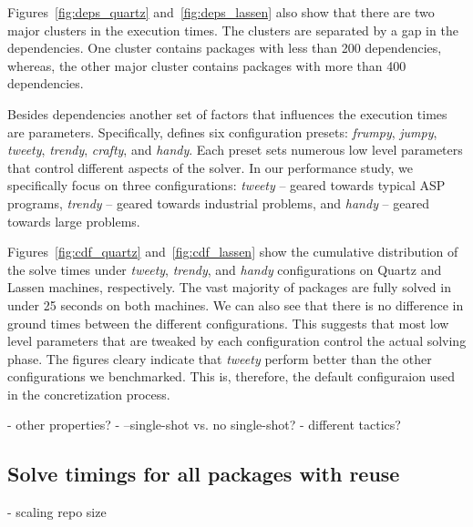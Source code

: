 Figures~\ref{fig:deps_quartz} and~\ref{fig:deps_lassen} also show that there are two major clusters in the execution times. The clusters are separated by a gap in the dependencies. One cluster contains packages with less than 200 dependencies, whereas, the other major cluster contains packages with more than 400 dependencies. 


Besides dependencies another set of factors that influences the execution times are \clingo{} parameters. Specifically, \clingo{} defines six configuration presets: \emph{frumpy}, \emph{jumpy}, \emph{tweety}, \emph{trendy}, \emph{crafty}, and \emph{handy}. Each preset sets numerous low level parameters that control different aspects of the solver. In our performance study, we specifically focus on three configurations: \emph{tweety} -- geared towards typical ASP programs, \emph{trendy} -- geared towards industrial problems, and \emph{handy} -- geared towards large problems.





Figures~\ref{fig:cdf_quartz} and~\ref{fig:cdf_lassen} show the cumulative distribution of the solve times under \emph{tweety}, \emph{trendy}, and \emph{handy} configurations on Quartz and Lassen machines, respectively. The vast majority of packages are fully solved in under 25 seconds on both machines. We can also see that there is no difference in ground times between the different configurations. This suggests that most low level parameters that are tweaked by each configuration control the actual solving phase. The figures cleary indicate that \emph{tweety} perform better than the other configurations we benchmarked. This is, therefore, the default configuraion used in the concretization process. 

- other properties?
- --single-shot vs. no single-shot?
- different tactics?

\subsection{Solve timings for all packages with reuse}
- scaling repo size






